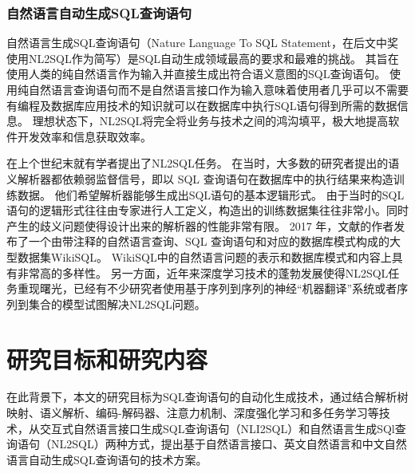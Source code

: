 \subsubsection{自然语言自动生成SQL查询语句}
\label{intro:nl2sql}
自然语言生成SQL查询语句（Nature Language To SQL Statement，在后文中奖使用NL2SQL作为简写）是SQL自动生成领域最高的要求和最难的挑战。
其旨在使用人类的纯自然语言作为输入并直接生成出符合语义意图的SQL查询语句。
使用纯自然语言查询语句而不是自然语言接口作为输入意味着使用者几乎可以不需要有编程及数据库应用技术的知识就可以在数据库中执行SQL语句得到所需的数据信息。
理想状态下，NL2SQL将完全将业务与技术之间的鸿沟填平，极大地提高软件开发效率和信息获取效率。

在上个世纪末就有学者提出了NL2SQL任务。
在当时，大多数的研究者提出的语义解析器都依赖弱监督信号，即以 SQL 查询语句在数据库中的执行结果来构造训练数据。
他们希望解析器能够生成出SQL语句的基本逻辑形式。
由于当时的SQL语句的逻辑形式往往由专家进行人工定义，构造出的训练数据集往往非常小。同时产生的歧义问题使得设计出来的解析器的性能非常有限。
2017 年，文献\cite{zhong2017seq2sql}的作者发布了一个由带注释的自然语言查询、SQL 查询语句和对应的数据库模式构成的大型数据集WikiSQL。
WikiSQL中的自然语言问题的表示和数据库模式和内容上具有非常高的多样性。
另一方面，近年来深度学习技术的蓬勃发展使得NL2SQL任务重现曙光，已经有不少研究者使用基于序列到序列的神经“机器翻译”系统或者序列到集合的模型试图解决NL2SQL问题。



\section{研究目标和研究内容}
\label{intro:targetandcontent}

在此背景下，本文的研究目标为SQL查询语句的自动化生成技术，通过结合解析树映射、语义解析、编码-解码器、注意力机制、深度强化学习和多任务学习等技术，从交互式自然语言接口生成SQL查询语句（NLI2SQL）和自然语言生成SQl查询语句（NL2SQL）两种方式，提出基于自然语言接口、英文自然语言和中文自然语言自动生成SQL查询语句的技术方案。

